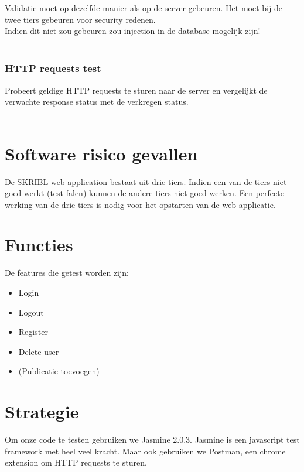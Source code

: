 \documentclass{article}
\begin{document}
Validatie moet op dezelfde manier als op de server gebeuren. Het moet bij de twee tiers gebeuren voor security redenen.
\\
Indien dit niet zou gebeuren zou injection in de database mogelijk zijn!
\\
\\

\subsubsection{HTTP requests test}
Probeert geldige HTTP requests te sturen naar de server en vergelijkt de verwachte response status met de verkregen status. 
\\
\\

\section{Software risico gevallen}
De SKRIBL web-application bestaat uit drie tiers. Indien een van de tiers niet goed werkt (test falen) kunnen de andere tiers niet goed werken. Een perfecte werking van de drie tiers is nodig voor het opstarten van de web-applicatie.

\section{Functies}
De features die getest worden zijn:
\begin{itemize}
  \item Login 
  \item Logout 
  \item Register
  \item Delete user
  \item (Publicatie toevoegen) 
\end{itemize}

\section{Strategie}
Om onze code te testen gebruiken we Jasmine 2.0.3. Jasmine is een javascript test framework met heel veel kracht. Maar ook gebruiken we Postman, een chrome extension om HTTP requests te sturen.
\end{document}
